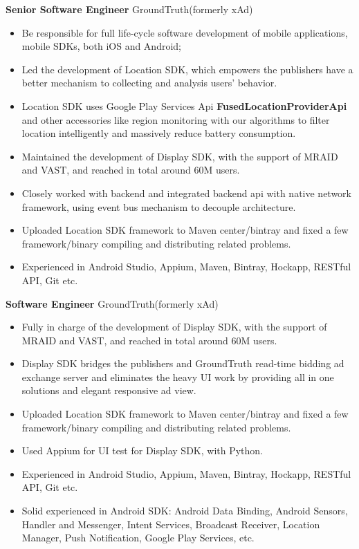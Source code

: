 \documentclass[10pt,letterpaper,sans]{moderncv}        %
\begin{document}
{\textbf{Senior Software Engineer}}
{GroundTruth(formerly xAd)}{}{}{
\begin{itemize}
\item Be responsible for full life-cycle software development of mobile applications, mobile SDKs, both iOS and Android;
\item Led the development of Location SDK, which empowers the publishers have a better mechanism to collecting and analysis users' behavior.
\item Location SDK uses Google Play Services Api \textbf{FusedLocationProviderApi} and other accessories like region monitoring with our algorithms to filter location intelligently and massively reduce battery consumption.
\item Maintained the development of Display SDK, with the support of MRAID and VAST, and reached in total around 60M users.
\item Closely worked with backend and integrated backend api with native network framework, using event bus mechanism to decouple architecture.
\item Uploaded Location SDK framework to Maven center/bintray and fixed a few framework/binary compiling and distributing related problems.
\item Experienced in Android Studio, Appium, Maven, Bintray, Hockapp, RESTful API, Git etc.
\end{itemize}} 

\vspace*{0.5cm}
{\textbf{Software Engineer}}
{GroundTruth(formerly xAd)}{}{}{
\begin{itemize}
\item Fully in charge of the development of Display SDK, with the support of MRAID and VAST, and reached in total around 60M users.
\item Display SDK bridges the publishers and GroundTruth read-time bidding ad exchange server and eliminates the heavy UI work by providing all in one solutions and elegant responsive ad view.
\item Uploaded Location SDK framework to Maven center/bintray and fixed a few framework/binary compiling and distributing related problems.
\item Used Appium for UI test for Display SDK, with Python.
\item Experienced in Android Studio, Appium, Maven, Bintray, Hockapp, RESTful API, Git etc.
\item Solid experienced in Android SDK: Android Data Binding, Android Sensors, Handler and Messenger, Intent Services, Broadcast Receiver, Location Manager, Push Notification, Google Play Services, etc.
\end{itemize}} 
\end{document}
